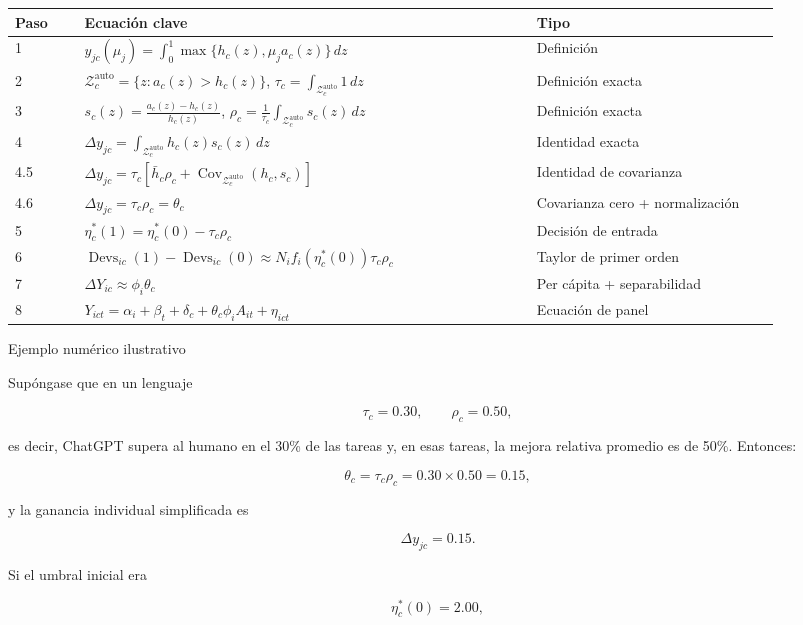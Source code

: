 \documentclass[12pt,a4paper]{article}
\let\textbf\textmd
\newcommand{\Zauto}{\mathcal{Z}^{\mathrm{auto}}_c}
\newcommand{\Covauto}{\operatorname{Cov}_{\Zauto}}
\newcommand{\Devs}{\operatorname{Devs}}
\newcommand{\dd}{\,dz}
\begin{document}
\begin{center}
\begin{tabular}{p{0.08\linewidth}p{0.52\linewidth}p{0.29\linewidth}}
\toprule
Paso & Ecuación clave & Tipo \\
\midrule
1 &
$\displaystyle y_{jc}(\mu_j)=\int_0^1\max\{h_c(z),\mu_j a_c(z)\}\dd$ &
Definición \\
2 &
$\displaystyle \Zauto=\{z:a_c(z)>h_c(z)\}$, $\displaystyle \tau_c=\int_{\Zauto}1\dd$ &
Definición exacta \\
3 &
$\displaystyle s_c(z)=\frac{a_c(z)-h_c(z)}{h_c(z)}$, $\displaystyle \rho_c=\frac{1}{\tau_c}\int_{\Zauto}s_c(z)\dd$ &
Definición exacta \\
4 &
$\displaystyle \Delta y_{jc}=\int_{\Zauto}h_c(z)s_c(z)\dd$ &
Identidad exacta \\
4.5 &
$\displaystyle \Delta y_{jc}=\tau_c[\bar h_c\rho_c+\Covauto(h_c,s_c)]$ &
Identidad de covarianza \\
4.6 &
$\displaystyle \Delta y_{jc}=\tau_c\rho_c=\theta_c$ &
Covarianza cero + normalización \\
5 &
$\displaystyle \eta_c^*(1)=\eta_c^*(0)-\tau_c\rho_c$ &
Decisión de entrada \\
6 &
$\displaystyle \Devs_{ic}(1)-\Devs_{ic}(0)\approx N_i f_i(\eta_c^*(0))\tau_c\rho_c$ &
Taylor de primer orden \\
7 &
$\displaystyle \Delta Y_{ic}\approx \phi_i\theta_c$ &
Per cápita + separabilidad \\
8 &
$\displaystyle Y_{ict}=\alpha_i+\beta_t+\delta_c+\theta_c\phi_i A_{it}+\eta_{ict}$ &
Ecuación de panel \\
\bottomrule
\end{tabular}
\end{center}

\bigskip
\noindent\textbf{Ejemplo numérico ilustrativo}

\medskip
\noindent Supóngase que en un lenguaje

\[
\tau_c=0.30,\qquad \rho_c=0.50,
\]

es decir, ChatGPT supera al humano en el 30\% de las tareas y, en esas tareas, la mejora relativa promedio es de 50\%. Entonces:

\[
\theta_c=\tau_c\rho_c=0.30\times 0.50=0.15,
\]

y la ganancia individual simplificada es

\[
\Delta y_{jc}=0.15.
\]

Si el umbral inicial era

\[
\eta_c^*(0)=2.00,
\]
\end{document}
